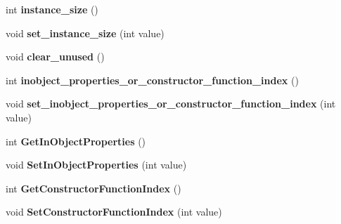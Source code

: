 \begin{DoxyCompactItemize}
\item 
int {\bfseries instance\+\_\+size} ()\hypertarget{classv8_1_1internal_1_1_map_a7cd69a3a08d04653aae1738f78cc7709}{}\label{classv8_1_1internal_1_1_map_a7cd69a3a08d04653aae1738f78cc7709}

\item 
void {\bfseries set\+\_\+instance\+\_\+size} (int value)\hypertarget{classv8_1_1internal_1_1_map_ab062bb7dd38c7934406ae01bc2cc949d}{}\label{classv8_1_1internal_1_1_map_ab062bb7dd38c7934406ae01bc2cc949d}

\item 
void {\bfseries clear\+\_\+unused} ()\hypertarget{classv8_1_1internal_1_1_map_ae450425c4b35b5cd4987bb730ea0b87c}{}\label{classv8_1_1internal_1_1_map_ae450425c4b35b5cd4987bb730ea0b87c}

\item 
int {\bfseries inobject\+\_\+properties\+\_\+or\+\_\+constructor\+\_\+function\+\_\+index} ()\hypertarget{classv8_1_1internal_1_1_map_acc379a8e51487ac9a439227a9ea0b4c5}{}\label{classv8_1_1internal_1_1_map_acc379a8e51487ac9a439227a9ea0b4c5}

\item 
void {\bfseries set\+\_\+inobject\+\_\+properties\+\_\+or\+\_\+constructor\+\_\+function\+\_\+index} (int value)\hypertarget{classv8_1_1internal_1_1_map_ab419515a2a46364fb2af75be65daa590}{}\label{classv8_1_1internal_1_1_map_ab419515a2a46364fb2af75be65daa590}

\item 
int {\bfseries Get\+In\+Object\+Properties} ()\hypertarget{classv8_1_1internal_1_1_map_a1a3d3c4bc805502b9a15174a38ebd66f}{}\label{classv8_1_1internal_1_1_map_a1a3d3c4bc805502b9a15174a38ebd66f}

\item 
void {\bfseries Set\+In\+Object\+Properties} (int value)\hypertarget{classv8_1_1internal_1_1_map_a84a8bee427bd7fe325ca15bd556a64cd}{}\label{classv8_1_1internal_1_1_map_a84a8bee427bd7fe325ca15bd556a64cd}

\item 
int {\bfseries Get\+Constructor\+Function\+Index} ()\hypertarget{classv8_1_1internal_1_1_map_af7b225d6a786bd7cb9392ad520bf3715}{}\label{classv8_1_1internal_1_1_map_af7b225d6a786bd7cb9392ad520bf3715}

\item 
void {\bfseries Set\+Constructor\+Function\+Index} (int value)\hypertarget{classv8_1_1internal_1_1_map_a2a3e4023efbd179083831ee45a2377c3}{}\label{classv8_1_1internal_1_1_map_a2a3e4023efbd179083831ee45a2377c3}


\end{DoxyCompactItemize}
